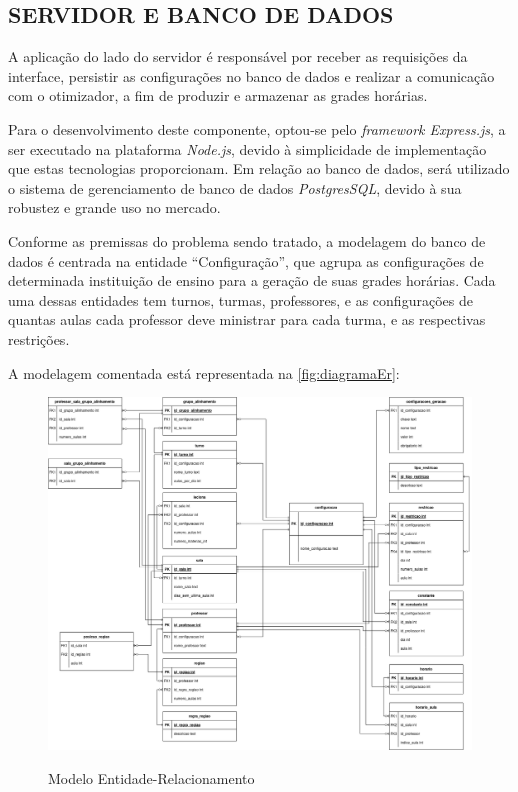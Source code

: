 \subsection{SERVIDOR E BANCO DE DADOS}

A aplicação do lado do servidor é responsável por receber as requisições da interface, persistir as configurações no banco de dados e realizar a comunicação com o otimizador, a fim de produzir e armazenar as grades horárias.

Para o desenvolvimento deste componente, optou-se pelo \textit{framework Express.js}, a ser executado na plataforma \textit{Node.js}, devido à simplicidade de implementação que estas tecnologias proporcionam. Em relação ao banco de dados, será utilizado o sistema de gerenciamento de banco de dados \textit{PostgresSQL}, devido à sua robustez e grande uso no mercado.

Conforme as premissas do problema sendo tratado, a modelagem do banco de dados é centrada na entidade ``Configuração'', que agrupa as configurações de determinada instituição de ensino para a geração de suas grades horárias. Cada uma dessas entidades tem turnos, turmas, professores, e as configurações de quantas aulas cada professor deve ministrar para cada turma, e as respectivas restrições.

A modelagem comentada está representada na \autoref{fig:diagramaEr}:

\begin{figure}[!htb]
	\centering
	\caption{Modelo Entidade-Relacionamento}
	\includegraphics[width=1\textwidth]{./dados/figuras/diagrama_er}
	\label{fig:diagramaEr}
\end{figure}
\newpage

